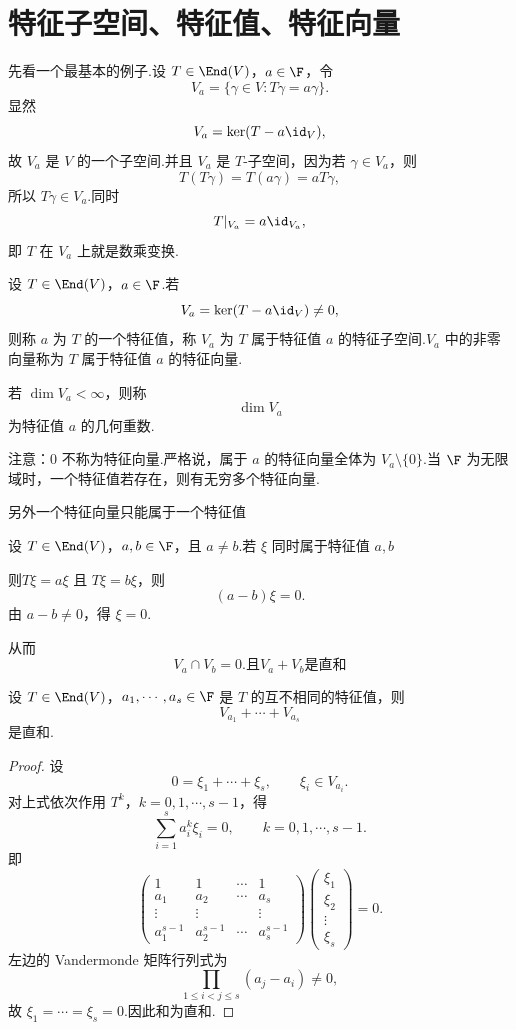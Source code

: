 \section{特征子空间、特征值、特征向量}

先看一个最基本的例子.设 $T\in\End(V)$，$a\in\F$，令
\[
V_a=\{\gamma\in V:T\gamma=a\gamma\}.
\]
显然
\[
V_a=\ker(T-a\id_V),
\]
故 $V_a$ 是 $V$ 的一个子空间.并且 $V_a$ 是 $T$-子空间，因为若 $\gamma\in V_a$，则
\[
T(T\gamma)=T(a\gamma)=aT\gamma,
\]
所以 $T\gamma\in V_a$.同时
\[
T|_{V_a}=a\id_{V_a},
\]
即 $T$ 在 $V_a$ 上就是数乘变换.

\begin{definition}
	设 $T\in\End(V)$，$a\in\F$.若
	\[
	V_a=\ker(T-a\id_V)\neq0,
	\]
	则称 $a$ 为 $T$ 的一个特征值，称 $V_a$ 为 $T$ 属于特征值 $a$ 的特征子空间.$V_a$ 中的非零向量称为 $T$ 属于特征值 $a$ 的特征向量.
	
	若 $\dim V_a<\infty$，则称
	\[
	\dim V_a
	\]
	为特征值 $a$ 的几何重数.
\end{definition}

注意：$0$ 不称为特征向量.严格说，属于 $a$ 的特征向量全体为 $V_a\setminus\{0\}$.当 $\F$ 为无限域时，一个特征值若存在，则有无穷多个特征向量.

另外一个特征向量只能属于一个特征值

	设 $T\in\End(V)$，$a,b\in\F$，且 $a\neq b$.若 $\xi$ 同时属于特征值 $a,b$

则$T\xi=a\xi$ 且 $T\xi=b\xi$，则
	\[
	(a-b)\xi=0.
	\]
	由 $a-b\neq0$，得 $\xi=0$.

从而
\[
V_a\cap V_b=0.\text{且}V_a + V_b \text{是直和}
\]

\begin{proposition}
	设 $T\in\End(V)$，$a_1,\cdots,a_s\in\F$ 是 $T$ 的互不相同的特征值，则
	\[
	V_{a_1}+\cdots+V_{a_s}
	\]
	是直和.
\end{proposition}

\begin{proof}
	设
	\[
	0=\xi_1+\cdots+\xi_s,\qquad \xi_i\in V_{a_i}.
	\]
	对上式依次作用 $T^k$，$k=0,1,\cdots,s-1$，得
	\[
	\sum_{i=1}^s a_i^k\xi_i=0,
	\qquad k=0,1,\cdots,s-1.
	\]
	即
	\[
	\begin{pmatrix}
		1&1&\cdots&1\\
		a_1&a_2&\cdots&a_s\\
		\vdots&\vdots&&\vdots\\
		a_1^{s-1}&a_2^{s-1}&\cdots&a_s^{s-1}
	\end{pmatrix}
	\begin{pmatrix}
		\xi_1\\ \xi_2\\ \vdots\\ \xi_s
	\end{pmatrix}
	=0.
	\]
	左边的 Vandermonde 矩阵行列式为
	\[
	\prod_{1\leq i<j\leq s}(a_j-a_i)\neq0,
	\]
	故 $\xi_1=\cdots=\xi_s=0$.因此和为直和.
\end{proof}


